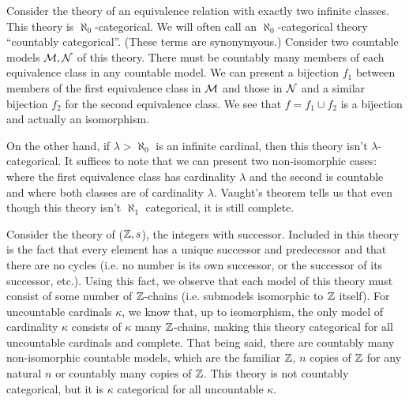 \begin{example}\label{example_categoricity_equiv}
Consider the theory of an equivalence relation with exactly two infinite classes. 
This theory is \(\aleph_0\)-categorical.
We will often call an \(\aleph_0\)-categorical theory ``countably categorical''.
(These terms are synonymyous.)  
Consider two countable models \(\mathcal{M}, \mathcal{N}\) of this theory. 
There must be countably many members of each equivalence class in any countable model. 
We can present a bijection \(f_1\) between members of the first equivalence class in  \(\mathcal{M}\) and those in \(\mathcal{N}\) and a similar bijection \(f_2\) for the second equivalence class. 
We see that \(f = f_1 \cup f_2\) is a bijection and actually an isomorphism. 

On the other hand, if \(\lambda > \aleph_0\) is an infinite cardinal, then this theory isn't \(\lambda\)-categorical. 
It suffices to note that we can present two non-isomorphic cases: where the first equivalence class has cardinality \(\lambda\) and the second is countable and where both classes are of cardinality \(\lambda\). 
Vaught's theorem tells us that even though this theory isn't \(\aleph_1\) categorical, it is still complete. 
\end{example}

\begin{example}\label{example_categoricity_integers}
Consider the theory of (\(\mathbb{Z}, s\)), the integers with successor. 
Included in this theory is the fact that every element has a unique successor and predecessor and that there are no cycles (i.e. no number is its own successor, or the successor of its successor, etc.). 
Using this fact, we observe that each model of this theory must consist of some number of \(\mathbb{Z}\)-chains (i.e. submodels isomorphic to \(\mathbb{Z}\) itself). 
For uncountable cardinals \(\kappa\), we know that, up to isomorphism, the only model of cardinality \(\kappa\) consists of \(\kappa\) many \(\mathbb{Z}\)-chains,
making this theory categorical for all uncountable cardinals and complete. 
That being said, there are countably many non-isomorphic countable models, which are the familiar \(\mathbb{Z}\), \(n\) copies of \(\mathbb{Z}\) for any natural \(n\) or countably many copies of \(\mathbb{Z}\). 
This theory is not countably categorical, but it is \(\kappa\) categorical for all uncountable \(\kappa\). 
\end{example}

